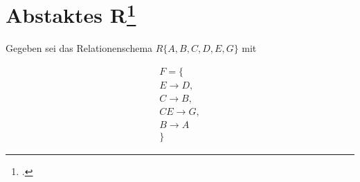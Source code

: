 \documentclass{lehramt-informatik-haupt}
\begin{document}
%

\section{Abstaktes R\footcite[Seite 1, Aufgabe 1]{db:ab:6}}

Gegeben sei das Relationenschema $R\{A, B, C, D, E, G\}$ mit

\begin{multline}
F = \{ \\
  E \rightarrow D, \\
  C \rightarrow B, \\
  CE \rightarrow G, \\
  B \rightarrow A \\
\}
\end{multline}
\end{document}
